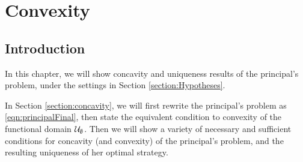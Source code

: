 \chapter{Convexity}\label{chapter:convexity}





\section{Introduction}\label{secttion:intro}

In this chapter, we will show concavity and uniqueness results of the principal's problem, under the settings in Section \ref{section:Hypotheses}.
\medskip

In Section \ref{section:concavity}, we will first rewrite the principal's problem as \eqref{eqn:principalFinal}, then state the equivalent condition to convexity of the functional domain $\mathcal{U}_{\emptyset}$. Then we will show a variety of necessary and sufficient conditions for concavity (and convexity) of the principal's problem, and the resulting uniqueness of her optimal strategy.  

